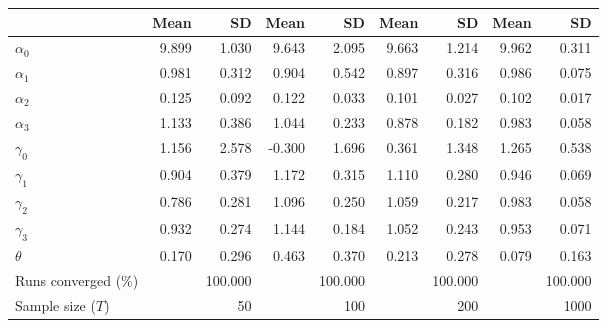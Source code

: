 
\begin{tabular}[t]{lrrrrrrrr}
\toprule
  & Mean & SD & Mean  & SD  & Mean   & SD   & Mean    & SD   \\
\midrule
$\alpha_{0}$ & 9.899 & 1.030 & 9.643 & 2.095 & 9.663 & 1.214 & 9.962 & 0.311\\
$\alpha_{1}$ & 0.981 & 0.312 & 0.904 & 0.542 & 0.897 & 0.316 & 0.986 & 0.075\\
$\alpha_{2}$ & 0.125 & 0.092 & 0.122 & 0.033 & 0.101 & 0.027 & 0.102 & 0.017\\
$\alpha_{3}$ & 1.133 & 0.386 & 1.044 & 0.233 & 0.878 & 0.182 & 0.983 & 0.058\\
$\gamma_{0}$ & 1.156 & 2.578 & -0.300 & 1.696 & 0.361 & 1.348 & 1.265 & 0.538\\
$\gamma_{1}$ & 0.904 & 0.379 & 1.172 & 0.315 & 1.110 & 0.280 & 0.946 & 0.069\\
$\gamma_{2}$ & 0.786 & 0.281 & 1.096 & 0.250 & 1.059 & 0.217 & 0.983 & 0.058\\
$\gamma_{3}$ & 0.932 & 0.274 & 1.144 & 0.184 & 1.052 & 0.243 & 0.953 & 0.071\\
$\theta$ & 0.170 & 0.296 & 0.463 & 0.370 & 0.213 & 0.278 & 0.079 & 0.163\\
Runs converged (\%) &  & 100.000 &  & 100.000 &  & 100.000 &  & 100.000\\
Sample size ($T$) &  & 50 &  & 100 &  & 200 &  & 1000\\
\bottomrule
\end{tabular}
